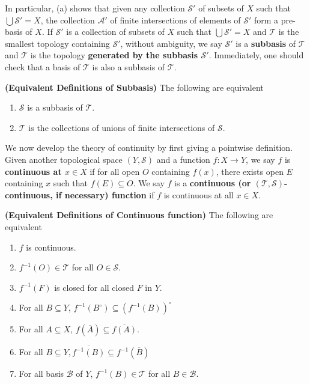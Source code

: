 \documentclass{report}
\begin{document}
\begin{mdframed}
\begin{enumerate}[label=(\alph*)]
\end{enumerate}
In particular, (a) shows that given any collection $\mathcal{ S}'$ of subsets of $X$ such that  $\bigcup \mathcal{ S}'=X$, the collection $\mathcal{A}'$ of finite intersections of elements of $\mathcal{ S}'$ form a pre-basis of $X$. If $\mathcal{S}'$ is a collection  of subsets of $X$ such that  $\bigcup \mathcal{ S}'=X$ and $\mathscr{T }$ is the smallest topology containing $\mathcal{S}'$, without ambiguity, we say $\mathcal{S}'$ is a \textbf{subbasis} of $\mathscr{T }$ and $\mathscr{T }$ is the topology \textbf{generated by the subbasis $\mathcal{ S}'$}. Immediately, one should check that a basis of  $\mathscr{T }$ is also a subbasis of $\mathscr{T }$.
\end{mdframed}
\begin{corollary}
\textbf{(Equivalent Definitions of Subbasis)} The following are equivalent 
\begin{enumerate}[label=(\alph*)]
  \item $\mathcal{S}$ is a subbasis of $\mathscr{T }$.
  \item $\mathscr{T }$ is the collections of unions of finite intersections of $\mathcal{ S}$.
\end{enumerate}
\end{corollary}
\begin{mdframed}
We now develop the theory of continuity by first giving a pointwise definition. Given another topological space $(Y,\mathscr{S})$ and a function $f:X\rightarrow Y$, we say $f$ is \textbf{continuous at $x\in X$} if for all open $O$ containing $f(x)$, there exists open $E$ containing $x$ such that $f(E)\subseteq O$. We say $f$ is a \textbf{continuous (or $(\mathscr{T },\mathscr{S })$-continuous, if necessary) function} if $f$ is continuous at all $x\in X$.  
\end{mdframed}
\begin{theorem}
\textbf{(Equivalent Definitions of Continuous function)} The following are equivalent 
\begin{enumerate}[label=(\alph*)]
  \item $f$ is continuous.
  \item  $f^{-1}(O)\in \mathscr{T }$ for all $O\in \mathscr{S }$.
  \item $f^{-1}(F)$ is closed for all closed $F$ in $Y$. 
  \item For all $B\subseteq Y$, $f^{-1}(B^\circ )\subseteq (f^{-1}(B))^{\circ }$
  \item For all $A\subseteq X$, $f(\overline{A})\subseteq \overline{f(A)}$. 
  \item For all $B\subseteq Y,\overline{f^{-1}(B)}\subseteq f^{-1}(\overline{B})$
  \item For all basis $\mathcal{B}$ of $Y$, $f^{-1}(B)\in \mathscr{T }$ for all $B \in \mathcal{B}$.
\end{enumerate}
\end{theorem}
\end{document}

